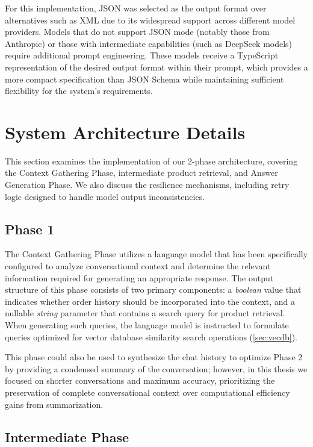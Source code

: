For this implementation, JSON was selected as the output format over alternatives such as XML due to its widespread support across different model providers.
Models that do not support JSON mode (notably those from Anthropic) or those with intermediate capabilities (such as DeepSeek models) require additional prompt engineering.
These models receive a TypeScript representation of the desired output format within their prompt, which provides a more compact specification than JSON Schema while maintaining sufficient flexibility for the system's requirements.

\section{System Architecture Details}

This section examines the implementation of our 2-phase architecture, covering the Context Gathering Phase, intermediate product retrieval, and Answer Generation Phase. We also discuss the resilience mechanisms, including retry logic designed to handle model output inconsistencies.

\subsection{Phase 1}

The Context Gathering Phase utilizes a language model that has been specifically configured to analyze conversational context and determine the relevant information required for generating an appropriate response.
The output structure of this phase consists of two primary components: a \textit{boolean} value that indicates whether order history should be incorporated into the context, and a nullable \textit{string} parameter that contains a search query for product retrieval.
When generating such queries, the language model is instructed to formulate queries optimized for vector database similarity search operations (\cref{sec:vecdb}).

This phase could also be used to synthesize the chat history to optimize Phase 2 by providing a condensed summary of the conversation; however, in this thesis we focused on shorter conversations and maximum accuracy, prioritizing the preservation of complete conversational context over computational efficiency gains from summarization.

\subsection{Intermediate Phase}

